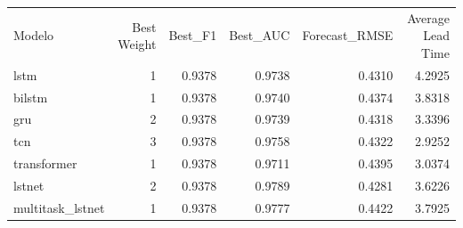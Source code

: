 \begin{tabular}{lrrrrr}
Modelo & Best Weight & Best_F1 & Best_AUC & Forecast_RMSE & Average Lead Time \\
lstm & 1 & 0.9378 & 0.9738 & 0.4310 & 4.2925 \\
bilstm & 1 & 0.9378 & 0.9740 & 0.4374 & 3.8318 \\
gru & 2 & 0.9378 & 0.9739 & 0.4318 & 3.3396 \\
tcn & 3 & 0.9378 & 0.9758 & 0.4322 & 2.9252 \\
transformer & 1 & 0.9378 & 0.9711 & 0.4395 & 3.0374 \\
lstnet & 2 & 0.9378 & 0.9789 & 0.4281 & 3.6226 \\
multitask_lstnet & 1 & 0.9378 & 0.9777 & 0.4422 & 3.7925 \\
\end{tabular}
